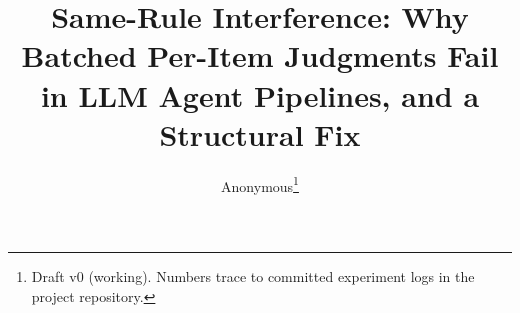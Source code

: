 \documentclass[11pt]{article}
\title{Same-Rule Interference: Why Batched Per-Item Judgments Fail\\in LLM Agent Pipelines, and a Structural Fix}
\author{Anonymous\thanks{Draft v0 (working). Numbers trace to committed experiment logs in the project repository.}}
\date{}
\begin{document}
\maketitle

\begin{abstract}

\end{abstract}












\end{document}
